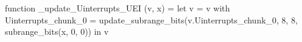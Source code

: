 function _update_Uinterrupts_UEI (v, x) = let v = { v with Uinterrupts_chunk_0 = update_subrange_bits(v.Uinterrupts_chunk_0, 8, 8, subrange_bits(x, 0, 0)) } in
  v
